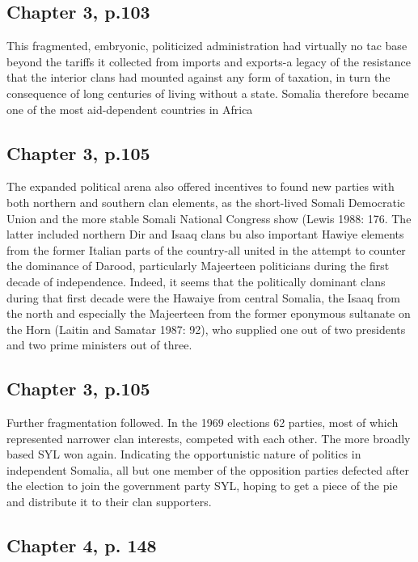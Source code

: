\documentclass[12pt]{article}
\begin{document}
\subsection{Chapter 3, p.103}

This fragmented, embryonic, politicized administration had virtually no tac base
beyond the tariffs it collected from imports and exports-a legacy of the
resistance that the interior clans had mounted against any form of taxation, in
turn the consequence of long centuries of living without a state.  Somalia
therefore became one of the most aid-dependent countries in Africa

\subsection{Chapter 3, p.105}

The expanded political arena also offered incentives to found new parties with
both northern and southern clan elements, as the short-lived Somali Democratic
Union and the more stable Somali National Congress show (Lewis 1988: 176.  The
latter included northern Dir and Isaaq clans bu also important Hawiye elements
from the former Italian parts of the country-all united in the attempt to
counter the dominance of Darood, particularly Majeerteen politicians during the
first decade of independence.  Indeed, it seems that the politically dominant
clans during that first decade were the Hawaiye from central Somalia, the Isaaq
from the north and especially the Majeerteen from the former eponymous sultanate
on the Horn (Laitin and Samatar 1987: 92), who supplied one out of two
presidents and two prime ministers out of three.

\subsection{Chapter 3, p.105}

Further fragmentation followed.  In the 1969 elections 62 parties, most of
which represented narrower clan interests, competed with each other.  The more
broadly based SYL won again.  Indicating the opportunistic nature of politics in
independent Somalia, all but one member of the opposition parties defected after
the election to join the government party SYL, hoping to get a piece of the pie
and distribute it to their clan supporters.

\subsection{Chapter 4, p. 148}
\end{document}
